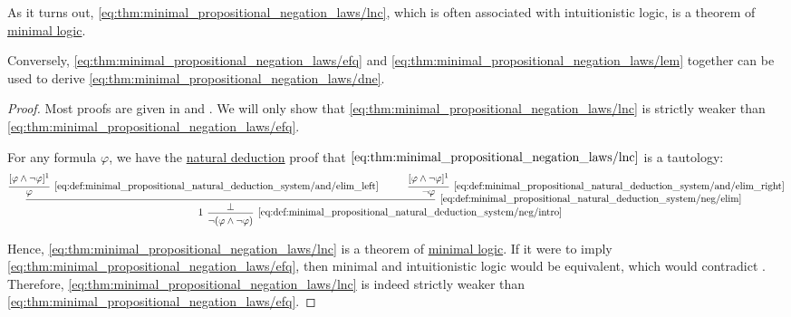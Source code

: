 \begin{theorem}
  As it turns out, \eqref{eq:thm:minimal_propositional_negation_laws/lnc}, which is often associated with intuitionistic logic, is a theorem of \hyperref[rem:minimal_logic]{minimal logic}.

  Conversely, \eqref{eq:thm:minimal_propositional_negation_laws/efq} and \eqref{eq:thm:minimal_propositional_negation_laws/lem} together can be used to derive \eqref{eq:thm:minimal_propositional_negation_laws/dne}.
\end{theorem}
\begin{proof}
  Most proofs are given in \cite[prop. 3]{DienerMcKubreJordens2016} and \cite[prop. 13]{DienerMcKubreJordens2016}. We will only show that \eqref{eq:thm:minimal_propositional_negation_laws/lnc} is strictly weaker than \eqref{eq:thm:minimal_propositional_negation_laws/efq}.

  For any formula \( \varphi \), we have the \hyperref[def:minimal_propositional_natural_deduction_system]{natural deduction} proof that \( \eqref{eq:thm:minimal_propositional_negation_laws/lnc} \) is a tautology:
  \begin{equation*}
    \begin{prooftree}[separation=3em]
      \hypo{ [\varphi \wedge \neg \varphi]^1 }
      \infer1[\ref{eq:def:minimal_propositional_natural_deduction_system/and/elim_left}]{ \varphi }

      \hypo{ [\varphi \wedge \neg \varphi]^1 }
      \infer1[\ref{eq:def:minimal_propositional_natural_deduction_system/and/elim_right}]{ \neg \varphi }

      \infer2[\ref{eq:def:minimal_propositional_natural_deduction_system/neg/elim}]{ \bot }

      \infer[left label=\( 1 \)]1[\ref{eq:def:minimal_propositional_natural_deduction_system/neg/intro}]{ \neg (\varphi \wedge \neg \varphi) }
    \end{prooftree}
  \end{equation*}

  Hence, \eqref{eq:thm:minimal_propositional_negation_laws/lnc} is a theorem of \hyperref[rem:minimal_logic]{minimal logic}. If it were to imply \eqref{eq:thm:minimal_propositional_negation_laws/efq}, then minimal and intuitionistic logic would be equivalent, which would contradict \cite[prop. 3]{DienerMcKubreJordens2016}. Therefore, \eqref{eq:thm:minimal_propositional_negation_laws/lnc} is indeed strictly weaker than \eqref{eq:thm:minimal_propositional_negation_laws/efq}.
\end{proof}


